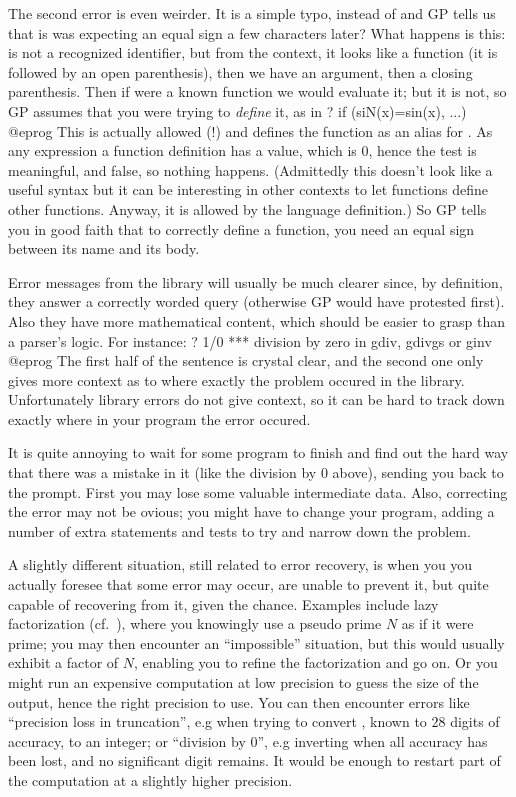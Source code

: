 The second error is even weirder. It is a simple typo,  instead of
 and GP tells us that is was expecting an equal sign a few
characters later? What happens is this:  is not a recognized
identifier, but from the context, it looks like a function (it is followed by
an open parenthesis), then we have an argument, then a closing parenthesis.
Then if  were a known function we would evaluate it; but it is not,
so GP assumes that you were trying to \emph{define} it, as in
\bprog 
? if (siN(x)=sin(x), ...)
@eprog
This is actually allowed (!) and defines the function  as an alias for
. As any expression a function definition has a value, which is $0$,
hence the test is meaningful, and false, so nothing happens. (Admittedly this
doesn't look like a useful syntax but it can be interesting in other contexts
to let functions define other functions. Anyway, it is allowed by the
language definition.)  So GP tells you in good faith that to correctly define
a function, you need an equal sign between its name and its body.

Error messages from the library will usually be much clearer since, by
definition, they answer a correctly worded query (otherwise GP would have
protested first). Also they have more mathematical content, which should be
easier to grasp than a parser's logic. For instance:
\bprog
? 1/0
  ***   division by zero in gdiv, gdivgs or ginv
@eprog
The first half of the sentence is crystal clear, and the second one only
gives more context as to where exactly the problem occured in the library.
Unfortunately library errors do not give context, so it can be hard to track
down exactly where in your program the error occured.

\label{se:errorrec}

It is quite annoying to wait for some program to finish and find out the hard
way that there was a mistake in it (like the division by 0 above), sending
you back to the prompt. First you may lose some valuable intermediate data.
Also, correcting the error may not be ovious; you might have to change your
program, adding a number of extra statements and tests to try and narrow down
the problem.

A slightly different situation, still related to error recovery, is when you
you actually foresee that some error may occur, are unable to prevent it, but
quite capable of recovering from it, given the chance. Examples include lazy
factorization (cf.~), where you knowingly use a pseudo prime
$N$ as if it were prime; you may then encounter an ``impossible'' situation,
but this would usually exhibit a factor of $N$, enabling you to refine the
factorization and go on. Or you might run an expensive computation at low
precision to guess the size of the output, hence the right precision to use.
You can then encounter errors like ``precision loss in truncation'', e.g when
trying to convert , known to $28$ digits of accuracy, to an
integer; or ``division by 0'', e.g inverting  when all accuracy
has been lost, and no significant digit remains. It would be enough to
restart part of the computation at a slightly higher precision.

